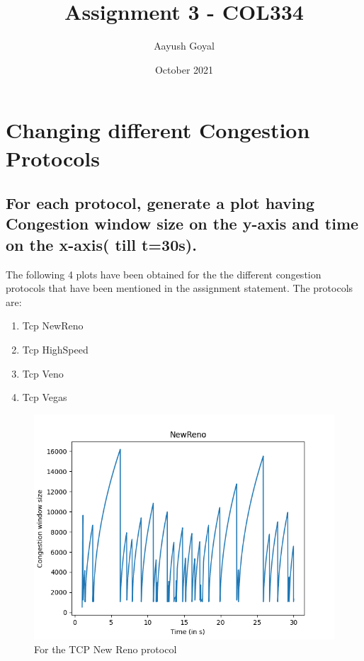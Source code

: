 \documentclass{article}
\title{Assignment 3 - COL334}
\author{Aayush Goyal}
\date{October 2021}
\begin{document}
\maketitle

\tableofcontents

\section{Changing different Congestion Protocols}

\subsection{For each protocol, generate a plot having Congestion window size on the y-axis and
time on the x-axis( till t=30s).}
The following 4 plots have been obtained for the the different congestion protocols that have been mentioned in the assignment statement. The protocols are:
\begin{enumerate}
    \item Tcp NewReno
    \item Tcp HighSpeed
    \item Tcp Veno
    \item Tcp Vegas
\end{enumerate}
\begin{figure}[H]
    \centering
    \includegraphics[scale = 0.8]{Q1/outputs/plots/NewReno.png}
    \caption{For the TCP New Reno protocol}
\end{figure}
\end{document}
